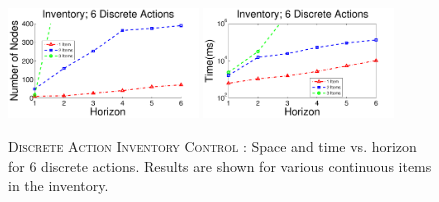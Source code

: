 \documentclass[twoside,11pt]{article}
\newcommand{\InventoryControl}{\textsc{Inventory Control }}
\begin{document}
\begin{figure}[tbp!]
\vspace{-2mm}
\centering
\includegraphics[width=0.45\textwidth]{Figures2/camdp/invD6Node.pdf}
\hspace{2mm}
\includegraphics[width=0.45\textwidth]{Figures2/camdp/invD6Time.pdf}
\vspace{-2mm}
\caption{%
\textsc{Discrete Action} \InventoryControl: Space and time vs. horizon for 6 discrete actions. Results are shown for various continuous items in the inventory.
}
\label{fig:invD6}
\vspace{-2mm}
\end{figure}
\end{document}
